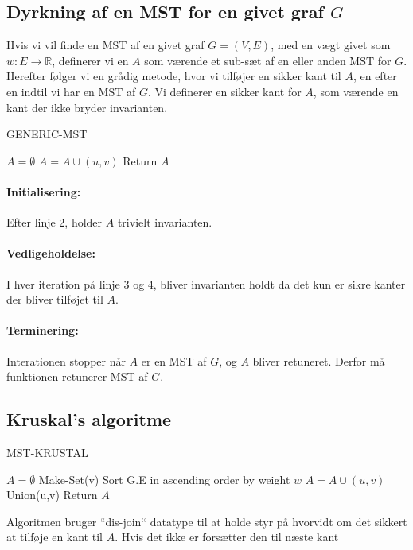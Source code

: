 \documentclass[12pt]{article}
\begin{document}
\subsection*{Dyrkning af en MST for en givet graf $G$}
Hvis vi vil finde en MST af en givet graf $G=(V,E)$, med en vægt givet som $w : E \rightarrow \mathbb{R}$, definerer vi en $A$ som værende et sub-sæt af en eller anden MST for $G$.
Herefter følger vi en grådig metode, hvor vi tilføjer en sikker kant til $A$,  en efter en indtil vi har en MST af $G$. Vi definerer en sikker kant for $A$, som værende en kant der ikke bryder invarianten.
\begin{algorithm}
 \caption{GENERIC-MST}
 \begin{algorithmic}
	\State $A = \emptyset$
		\State $A = A \cup {(u,v)}$
	\EndWhile
	\State Return $A$
	\EndFunction
\end{algorithmic}
\end{algorithm}
\paragraph{Initialisering: } Efter linje 2, holder $A$ trivielt invarianten.
\paragraph{Vedligeholdelse: } I hver iteration på linje 3 og 4, bliver invarianten holdt da det kun er sikre kanter der bliver tilføjet til $A$.
\paragraph{Terminering: } Interationen stopper når $A$ er en MST af $G$, og $A$ bliver retuneret. Derfor må funktionen retunerer MST af $G$.
\subsection*{Kruskal's algoritme}
\begin{algorithm}
 \caption{MST-KRUSTAL}
 \begin{algorithmic}
	\State $A = \emptyset$
		Make-Set(v)
	\EndFor
	\State Sort G.E in ascending order by weight $w$
			\State $A = A \cup {(u,v)}$
			\State Union(u,v)
		\EndIf
	\EndFor
	\State Return $A$
	\EndFunction
\end{algorithmic}
\end{algorithm}
Algoritmen bruger ``dis-join`` datatype til at holde styr på hvorvidt om det sikkert at tilføje en kant til $A$. Hvis det ikke er forsætter den til næste kant
\end{document}
